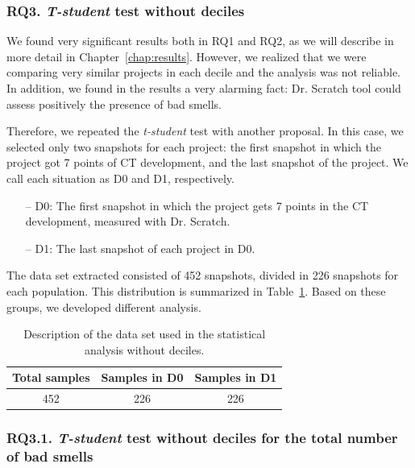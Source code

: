\subsubsection{RQ3. \textit{T-student} test without deciles}
\label{subsubsec:rq3_t_student_no_deciles}

We found very significant results both in RQ1 and RQ2, as we will describe in more detail in Chapter~\ref{chap:results}. However, we realized that we were comparing very similar projects in each decile and the analysis was not reliable. In addition, we found in the results a very alarming fact: Dr. Scratch tool could assess positively the presence of bad smells. 

Therefore, we repeated the \textit{t-student} test with another proposal. In this case, we selected only two snapshots for each project: the first snapshot in which the project got 7 points of CT development, and the last snapshot of the project. We call each situation as D0 and D1, respectively.

\begin{itemize}
    \item[--] D0: The first snapshot in which the project gets 7 points in the CT development, measured with Dr. Scratch. 
    \item[--] D1: The last snapshot of each project in D0.
\end{itemize}

The data set extracted consisted of 452 snapshots, divided in 226 snapshots for each population. This distribution is summarized in Table~\ref{table:distribution_without_deciles}. Based on these groups, we developed different analysis.

\begin{table}
    \centering
    \begin{tabular}{|c|c|c|}
        \hline
        \textbf{Total samples} & \textbf{Samples in D0} & \textbf{Samples in D1} \\ \hline
        452 & 226 & 226 \\ \hline
    \end{tabular}
    \caption{Description of the data set used in the statistical analysis without deciles.}
    \label{table:distribution_without_deciles}
\end{table}

\subsubsection{RQ3.1. \textit{T-student} test without deciles for the total number of bad smells}
\label{subsubsec:RQ3_1_statistical}

